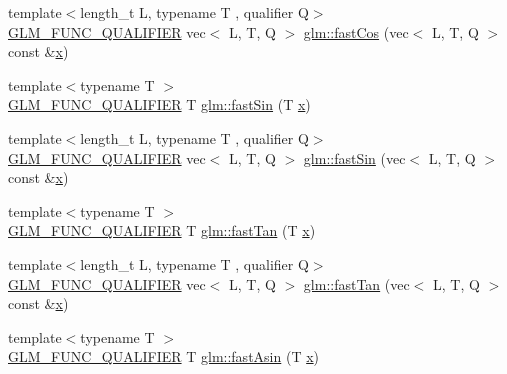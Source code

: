 \begin{DoxyCompactItemize}
\item 
{\footnotesize template$<$length\+\_\+t L, typename T , qualifier Q$>$ }\\\hyperlink{setup_8hpp_a33fdea6f91c5f834105f7415e2a64407}{G\+L\+M\+\_\+\+F\+U\+N\+C\+\_\+\+Q\+U\+A\+L\+I\+F\+I\+ER} vec$<$ L, T, Q $>$ \hyperlink{namespaceglm_a3a4a9ffb43805a0d99dc508beeeaf4be}{glm\+::fast\+Cos} (vec$<$ L, T, Q $>$ const \&\hyperlink{_s_d_l__opengl_8h_ad0e63d0edcdbd3d79554076bf309fd47}{x})
\item 
{\footnotesize template$<$typename T $>$ }\\\hyperlink{setup_8hpp_a33fdea6f91c5f834105f7415e2a64407}{G\+L\+M\+\_\+\+F\+U\+N\+C\+\_\+\+Q\+U\+A\+L\+I\+F\+I\+ER} T \hyperlink{group__gtx__fast__trigonometry_ga0aab3257bb3b628d10a1e0483e2c6915}{glm\+::fast\+Sin} (T \hyperlink{_s_d_l__opengl_8h_ad0e63d0edcdbd3d79554076bf309fd47}{x})
\item 
{\footnotesize template$<$length\+\_\+t L, typename T , qualifier Q$>$ }\\\hyperlink{setup_8hpp_a33fdea6f91c5f834105f7415e2a64407}{G\+L\+M\+\_\+\+F\+U\+N\+C\+\_\+\+Q\+U\+A\+L\+I\+F\+I\+ER} vec$<$ L, T, Q $>$ \hyperlink{namespaceglm_a096bd67e1f2c815e9398d960fef0df83}{glm\+::fast\+Sin} (vec$<$ L, T, Q $>$ const \&\hyperlink{_s_d_l__opengl_8h_ad0e63d0edcdbd3d79554076bf309fd47}{x})
\item 
{\footnotesize template$<$typename T $>$ }\\\hyperlink{setup_8hpp_a33fdea6f91c5f834105f7415e2a64407}{G\+L\+M\+\_\+\+F\+U\+N\+C\+\_\+\+Q\+U\+A\+L\+I\+F\+I\+ER} T \hyperlink{group__gtx__fast__trigonometry_gaf29b9c1101a10007b4f79ee89df27ba2}{glm\+::fast\+Tan} (T \hyperlink{_s_d_l__opengl_8h_ad0e63d0edcdbd3d79554076bf309fd47}{x})
\item 
{\footnotesize template$<$length\+\_\+t L, typename T , qualifier Q$>$ }\\\hyperlink{setup_8hpp_a33fdea6f91c5f834105f7415e2a64407}{G\+L\+M\+\_\+\+F\+U\+N\+C\+\_\+\+Q\+U\+A\+L\+I\+F\+I\+ER} vec$<$ L, T, Q $>$ \hyperlink{namespaceglm_ab77424475017f729a5b8a97c2eb9d0d1}{glm\+::fast\+Tan} (vec$<$ L, T, Q $>$ const \&\hyperlink{_s_d_l__opengl_8h_ad0e63d0edcdbd3d79554076bf309fd47}{x})
\item 
{\footnotesize template$<$typename T $>$ }\\\hyperlink{setup_8hpp_a33fdea6f91c5f834105f7415e2a64407}{G\+L\+M\+\_\+\+F\+U\+N\+C\+\_\+\+Q\+U\+A\+L\+I\+F\+I\+ER} T \hyperlink{group__gtx__fast__trigonometry_ga562cb62c51fbfe7fac7db0bce706b81f}{glm\+::fast\+Asin} (T \hyperlink{_s_d_l__opengl_8h_ad0e63d0edcdbd3d79554076bf309fd47}{x})

\end{DoxyCompactItemize}
